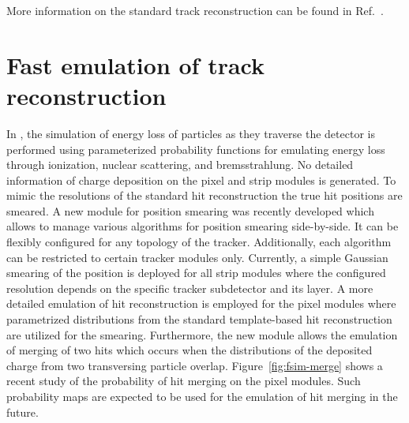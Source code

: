 More information on the standard track reconstruction can be found in Ref.~\cite{Chatrchyan:2014fea}.


\section{Fast emulation of track reconstruction}


In \FSIM, the simulation of energy loss of particles as they traverse the detector is performed using parameterized probability functions for emulating energy loss through ionization, nuclear scattering, and bremsstrahlung. No detailed information of charge deposition on the pixel and strip modules is generated. To mimic the resolutions of the standard hit reconstruction the true hit positions are smeared. A new \FSIM module for position smearing was recently developed which allows to manage various algorithms for position smearing side-by-side. It can be flexibly configured for any topology of the tracker. Additionally, each algorithm can be restricted to certain tracker modules only. Currently, a simple Gaussian smearing of the position is deployed for all strip modules where the configured resolution depends on the specific tracker subdetector and its layer. A more detailed emulation of hit reconstruction is employed for the pixel modules where parametrized distributions from the standard template-based hit reconstruction are utilized for the smearing. Furthermore, the new module allows the emulation of merging of two hits which occurs when the distributions of the deposited charge from two transversing particle overlap. Figure~\ref{fig:fsim-merge} shows a recent study of the probability of hit merging on the pixel modules. Such probability maps are expected to be used for the emulation of hit merging in the future.


